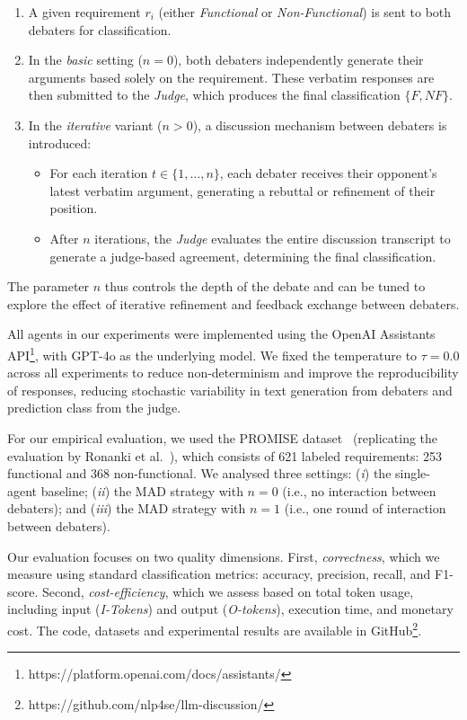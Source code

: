 \documentclass[conference]{IEEEtran}
\begin{document}
\begin{enumerate}
    \item A given requirement $r_i$ (either \textit{Functional} or \textit{Non-Functional}) is sent to both debaters for classification.
    \item In the \textit{basic} setting ($n = 0$), both debaters independently generate their arguments based solely on the requirement. These verbatim responses are then submitted to the \textit{Judge}, which produces the final classification $\{F,NF\}$.
    \item In the \textit{iterative} variant ($n > 0$), a discussion mechanism between debaters is introduced:
    \begin{itemize}
        \item For each iteration $t \in \{1, \dots,n\}$, each debater receives their opponent's latest verbatim argument, generating a rebuttal or refinement of their position.
        \item After $n$ iterations, the \textit{Judge} evaluates the entire discussion transcript to generate a judge-based agreement, determining the final classification.
    \end{itemize}
\end{enumerate}

The parameter $n$ thus controls the depth of the debate and can be tuned to explore the effect of iterative refinement and feedback exchange between debaters.

All agents in our experiments were implemented using the OpenAI Assistants API\footnote{https://platform.openai.com/docs/assistants/}, with GPT-4o as the underlying model. We fixed the temperature to $\tau = 0.0$ across all experiments to reduce non-determinism and improve the reproducibility of responses, reducing stochastic variability in text generation from debaters and prediction class from the judge.

For our empirical evaluation, we used the PROMISE dataset~\cite{ClelandHuang2007} (replicating the evaluation by Ronanki et al.~\cite{Ronanki2024}), which consists of 621 labeled requirements: 253 functional and 368 non-functional. We analysed three settings: (\textit{i}) the single-agent baseline; (\textit{ii}) the MAD strategy with $n=0$ (i.e., no interaction between debaters); and (\textit{iii}) the MAD strategy with $n=1$ (i.e., one round of interaction between debaters).

Our evaluation focuses on two quality dimensions. First, \textit{correctness}, which we measure using standard classification metrics: accuracy, precision, recall, and F1-score. Second, \textit{cost-efficiency}, which we assess based on total token usage, including input (\textit{I-Tokens}) and output (\textit{O-tokens}), execution time, and monetary cost. The code, datasets and experimental results are available in GitHub\footnote{https://github.com/nlp4se/llm-discussion/}.
\end{document}
